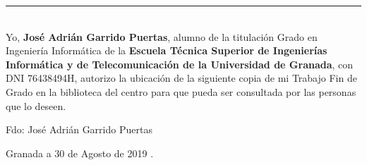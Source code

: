 \noindent\rule[-1ex]{\textwidth}{2pt}\\[4.5ex]

Yo, \textbf{José Adrián Garrido Puertas}, alumno de la titulación Grado en Ingeniería Informática de la \textbf{Escuela Técnica Superior
de Ingenierías Informática y de Telecomunicación de la Universidad de Granada}, con DNI 76438494H, autorizo la
ubicación de la siguiente copia de mi Trabajo Fin de Grado en la biblioteca del centro para que pueda ser
consultada por las personas que lo deseen.

\vspace{6cm}

\begin{flushright}
	\noindent Fdo: José Adrián Garrido Puertas
\end{flushright}

\begin{flushright}
	Granada a 30 de Agosto de 2019 .
\end{flushright}

\newpage %

